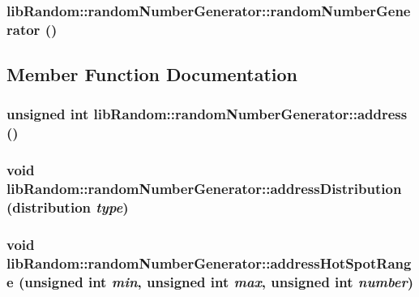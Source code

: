 \begin{CompactItemize}
{\subsubsection[{randomNumberGenerator}]{\setlength{\rightskip}{0pt plus 5cm}libRandom::randomNumberGenerator::randomNumberGenerator ()}}
\label{classlibRandom_1_1randomNumberGenerator_51655653697a9179d26c0059bf4581ba}




\subsection{Member Function Documentation}
\hypertarget{classlibRandom_1_1randomNumberGenerator_4adc688e3551a76d63bd5d5d83e2416e}{
\subsubsection[{address}]{\setlength{\rightskip}{0pt plus 5cm}unsigned int libRandom::randomNumberGenerator::address ()}}
\label{classlibRandom_1_1randomNumberGenerator_4adc688e3551a76d63bd5d5d83e2416e}


\hypertarget{classlibRandom_1_1randomNumberGenerator_7fa20dc1666eecd8615725c32859e8fd}{
\subsubsection[{addressDistribution}]{\setlength{\rightskip}{0pt plus 5cm}void libRandom::randomNumberGenerator::addressDistribution ({\bf distribution} {\em type})}}
\label{classlibRandom_1_1randomNumberGenerator_7fa20dc1666eecd8615725c32859e8fd}


\hypertarget{classlibRandom_1_1randomNumberGenerator_57d06cd2af1eaac82bec9d1d1ed24f46}{
\subsubsection[{addressHotSpotRange}]{\setlength{\rightskip}{0pt plus 5cm}void libRandom::randomNumberGenerator::addressHotSpotRange (unsigned int {\em min}, \/  unsigned int {\em max}, \/  unsigned int {\em number})}}
\label{classlibRandom_1_1randomNumberGenerator_57d06cd2af1eaac82bec9d1d1ed24f46}



\end{CompactItemize}
